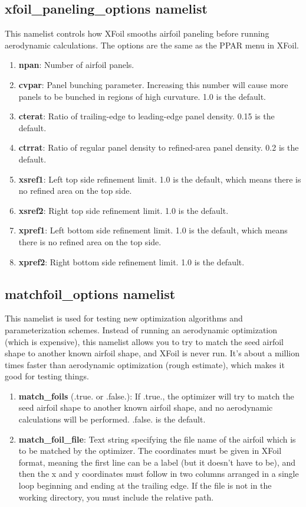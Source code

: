 \documentclass[11pt]{article}
\begin{document}
\subsection{xfoil\_paneling\_options namelist}

This namelist controls how XFoil smooths airfoil paneling before running aerodynamic
calculations.  The options are the same as the PPAR menu in XFoil.

\begin{enumerate}
\item{\textbf{npan}: Number of airfoil panels.}
\item{\textbf{cvpar}: Panel bunching parameter.  Increasing this number will cause more
panels to be bunched in regions of high curvature. 1.0 is the default.}
\item{\textbf{cterat}: Ratio of trailing-edge to leading-edge panel density.  0.15 is the
default.}
\item{\textbf{ctrrat}: Ratio of regular panel density to refined-area panel density.  0.2
is the default.}
\item{\textbf{xsref1}: Left top side refinement limit.  1.0 is the default, which means
there is no refined area on the top side.}
\item{\textbf{xsref2}: Right top side refinement limit.  1.0 is the default.}
\item{\textbf{xpref1}: Left bottom side refinement limit.  1.0 is the default, which means
there is no refined area on the top side.}
\item{\textbf{xpref2}: Right bottom side refinement limit.  1.0 is the default.}
\end{enumerate}

\subsection{matchfoil\_options namelist}

This namelist is used for testing new optimization algorithms and parameterization
schemes.  Instead of running an aerodynamic optimization (which is expensive), this
namelist allows you to try to match the seed airfoil shape to another known airfoil shape,
and XFoil is never run.  It's about a million times faster than aerodynamic optimization
(rough estimate), which makes it good for testing things.

\begin{enumerate}
\item{\textbf{match\_foils} (.true. or .false.): If .true., the optimizer will try to
match the seed airfoil shape to another known airfoil shape, and no aerodynamic
calculations will be performed.  .false. is the default.}
\item{\textbf{match\_foil\_file}: Text string specifying the file name of the airfoil
which is to be matched by the optimizer.  The coordinates must be given in XFoil format,
meaning the first line can be a label (but it doesn't have to be), and then the x and y
coordinates must follow in two columns arranged in a single loop beginning and ending at
the trailing edge. If the file is not in the working directory, you must include the
relative path.}
\end{enumerate}
\end{document}
